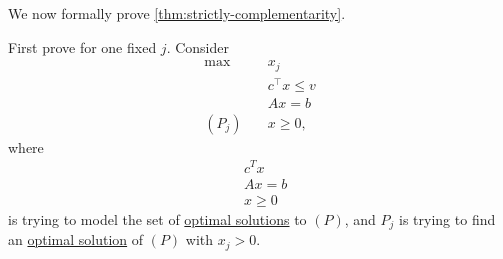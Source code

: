 We now formally prove \autoref{thm:strictly-complementarity}.
\begin{explanation}
	First prove for one fixed \(j\). Consider
	\begin{align*}
		\max~        & x_{j}            \\
		             & c^{\top}x \leq v \\
		             & Ax = b           \\
		(P_{j})\quad & x\geq 0,
	\end{align*}
	where
	\begin{align*}
		 & c^Tx    \\
		 & Ax = b  \\
		 & x\geq 0
	\end{align*}
	is trying to model the set of \hyperref[def:optimal-solution]{optimal solutions} to \((P)\), and \(P_{j}\) is trying to find an \hyperref[def:optimal-solution]{optimal solution}
	of \((P)\) with \(x_{j}>0\).


\end{explanation}
